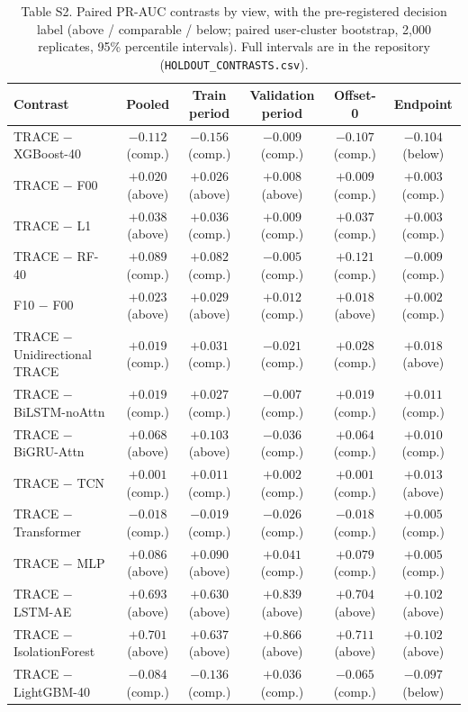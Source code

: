 \documentclass[10pt]{article}
\begin{document}
\begin{table}[h]\centering\small
\caption*{Table S2. Paired PR-AUC contrasts by view, with the pre-registered decision label (above / comparable / below; paired user-cluster bootstrap, 2,000 replicates, 95\% percentile intervals). Full intervals are in the repository (\texttt{HOLDOUT\_CONTRASTS.csv}).}
\begin{tabular}{lccccc}\toprule
Contrast & Pooled & Train period & Validation period & Offset-0 & Endpoint \\\midrule
TRACE $-$ XGBoost-40 & $-0.112$ (comp.) & $-0.156$ (comp.) & $-0.009$ (comp.) & $-0.107$ (comp.) & $-0.104$ (below) \\
TRACE $-$ F00 & $+0.020$ (above) & $+0.026$ (above) & $+0.008$ (above) & $+0.009$ (comp.) & $+0.003$ (comp.) \\
TRACE $-$ L1 & $+0.038$ (above) & $+0.036$ (comp.) & $+0.009$ (comp.) & $+0.037$ (comp.) & $+0.003$ (comp.) \\
TRACE $-$ RF-40 & $+0.089$ (comp.) & $+0.082$ (comp.) & $-0.005$ (comp.) & $+0.121$ (comp.) & $-0.009$ (comp.) \\
F10 $-$ F00 & $+0.023$ (above) & $+0.029$ (above) & $+0.012$ (comp.) & $+0.018$ (above) & $+0.002$ (comp.) \\
TRACE $-$ Unidirectional TRACE & $+0.019$ (comp.) & $+0.031$ (comp.) & $-0.021$ (comp.) & $+0.028$ (comp.) & $+0.018$ (above) \\
TRACE $-$ BiLSTM-noAttn & $+0.019$ (comp.) & $+0.027$ (comp.) & $-0.007$ (comp.) & $+0.019$ (comp.) & $+0.011$ (comp.) \\
TRACE $-$ BiGRU-Attn & $+0.068$ (above) & $+0.103$ (above) & $-0.036$ (comp.) & $+0.064$ (comp.) & $+0.010$ (comp.) \\
TRACE $-$ TCN & $+0.001$ (comp.) & $+0.011$ (comp.) & $+0.002$ (comp.) & $+0.001$ (comp.) & $+0.013$ (above) \\
TRACE $-$ Transformer & $-0.018$ (comp.) & $-0.019$ (comp.) & $-0.026$ (comp.) & $-0.018$ (comp.) & $+0.005$ (comp.) \\
TRACE $-$ MLP & $+0.086$ (above) & $+0.090$ (above) & $+0.041$ (comp.) & $+0.079$ (comp.) & $+0.005$ (comp.) \\
TRACE $-$ LSTM-AE & $+0.693$ (above) & $+0.630$ (above) & $+0.839$ (above) & $+0.704$ (above) & $+0.102$ (above) \\
TRACE $-$ IsolationForest & $+0.701$ (above) & $+0.637$ (above) & $+0.866$ (above) & $+0.711$ (above) & $+0.102$ (above) \\
TRACE $-$ LightGBM-40 & $-0.084$ (comp.) & $-0.136$ (comp.) & $+0.036$ (comp.) & $-0.065$ (comp.) & $-0.097$ (below) \\
\bottomrule\end{tabular}\end{table}
\end{document}
